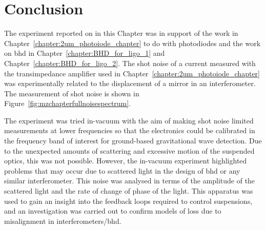 \section{Conclusion}
The experiment reported on in this Chapter was in support of the work in Chapter~\ref{chapter:2um_photoiode_chapter} to do with photodiodes and the work on \gls{bhd} in Chapter~\ref{chapter:BHD_for_ligo_1} and Chapter~\ref{chapter:BHD_for_ligo_2}. The shot noise of a current measured with the transimpedance amplifier used in Chapter~\ref{chapter:2um_photoiode_chapter} was experimentally related to the displacement of a mirror in an interferometer. The measurement of shot noise is shown in Figure~\ref{fig:mzchapterfullnoisespectrum}.
\par
The experiment was tried in-vacuum with the aim of making shot noise limited measurements at lower frequencies so that the electronics could be calibrated in the frequency band of interest for ground-based gravitational wave detection. Due to the unexpected amounts of scattering and excessive motion of the suspended optics, this was not possible. However, the in-vacuum experiment highlighted problems that may occur due to scattered light in the design of \gls{bhd} or any similar interferometer. This noise was analysed in terms of the amplitude of the scattered light and the rate of change of phase of the light. This apparatus was used to gain an insight into the feedback loops required to control suspensions, and an investigation was carried out to confirm models of loss due to misalignment in interferometers/\gls{bhd}. 
